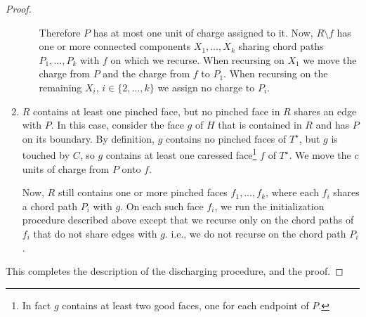 \documentclass[a4paper,UKenglish]{socg-lipics-v2019}
\newcommand{\dual}[1]{{#1}^\star}
\begin{document}
\begin{proof}
\begin{enumerate}
\begin{enumerate}
        Therefore $P$ has at most one unit of charge assigned to it.
        Now, $R\setminus f$ has one or more connected components
        $X_1,\ldots,X_k$ sharing chord paths $P_1,\ldots,P_k$ with $f$
        on which we recurse.  When recursing on $X_1$ we move the charge
        from $P$ and the charge from $f$ to $P_1$.  When recursing on
        the remaining $X_i$, $i\in\{2,\ldots,k\}$ we assign no charge
        to $P_i$.
  \end{enumerate}
  \item $R$ contains at least one pinched face, but no pinched face in $R$
  shares an edge with $P$.  In this case, consider the face $g$ of $H$
  that is contained in $R$ and has $P$ on its boundary. By definition,
  $g$ contains no pinched faces of $\dual{T}$, but $g$ is touched by $C$,
  so $g$ contains at least one caressed face\footnote{In fact $g$ contains at
  least two good faces, one for each endpoint of $P$.} $f$ of $\dual{T}$.
  We move the $c$ units of charge from $P$ onto $f$.

  Now, $R$ still contains one or more pinched faces
  $f_1,\ldots,f_k$, where each $f_i$ shares a chord path $P_i$ with $g$.
  On each such face $f_i$, we run the initialization procedure described
  above except that we recurse only on the chord paths of $f_i$ that
  do not share edges with $g$. i.e., we do not recurse on the chord
  path $P_i$.
\end{enumerate}
   This completes the description of the discharging procedure, and the proof.
\end{proof}
\end{document}
